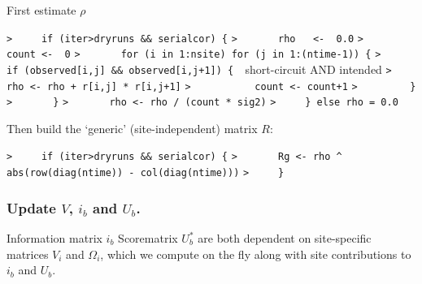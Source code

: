 \documentclass[a4paper]{article}
\begin{document}
First estimate $\rho$\par
\verb~>     if (iter>dryruns && serialcor) {~\newline
\verb~>       rho   <-  0.0~\newline
\verb~>       count <-  0~\newline
\verb~>       for (i in 1:nsite) for (j in 1:(ntime-1)) {~\newline
\verb~>         if (observed[i,j] && observed[i,j+1]) {  ~{\sffamily short-circuit AND intended}\newline
\verb~>           rho <- rho + r[i,j] * r[i,j+1]~\newline
\verb~>           count <- count+1~\newline
\verb~>         }~\newline
\verb~>       }~\newline
\verb~>       rho <- rho / (count * sig2)~\newline
\verb~>     } else rho = 0.0~\par

Then build the `generic' (site-independent) matrix $R$:\par
\verb~>     if (iter>dryruns && serialcor) {~\newline
\verb~>       Rg <- rho ^ abs(row(diag(ntime)) - col(diag(ntime)))~\newline
\verb~>     }~\par



\subsubsection{Update $V$, $i_b$ and $U_b$.}
Information matrix $i_b$ Scorematrix $U_b^\ast$ are both dependent on site-specific matrices
$V_i$ and $\Omega_i$, which we compute on the fly along with site contributions to $i_b$ and $U_b$.\par
\end{document}
